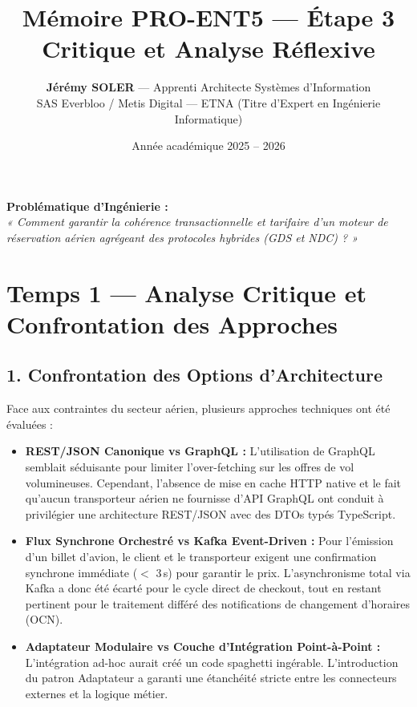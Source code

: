 \documentclass[11pt,a4paper]{article}
\title{\vspace{-1cm}\Huge\textbf{\textcolor{NavyBlue}{Mémoire PRO-ENT5 — Étape 3}}\\[6pt]
\Large\textbf{\textcolor{CobaltBlue}{Critique et Analyse Réflexive}}}
\author{\textbf{Jérémy SOLER} — Apprenti Architecte Systèmes d'Information\\
SAS Everbloo / Metis Digital — ETNA (Titre d'Expert en Ingénierie Informatique)}
\date{Année académique 2025 -- 2026}
\begin{document}
\maketitle

\vspace{0.2cm}
\begin{tcolorbox}[colback=LightGray, colframe=NavyBlue, arc=4pt, boxrule=1.1pt]
\centering\textbf{Problématique d'Ingénierie :}\\
\textit{« Comment garantir la cohérence transactionnelle et tarifaire d'un moteur de réservation aérien agrégeant des protocoles hybrides (GDS et NDC) ? »}
\end{tcolorbox}

\section*{Temps 1 — Analyse Critique et Confrontation des Approches}

\subsection*{1. Confrontation des Options d'Architecture}
Face aux contraintes du secteur aérien, plusieurs approches techniques ont été évaluées :
\begin{itemize}[itemsep=2pt]
    \item \textbf{REST/JSON Canonique vs GraphQL :} L'utilisation de GraphQL semblait séduisante pour limiter l'over-fetching sur les offres de vol volumineuses. Cependant, l'absence de mise en cache HTTP native et le fait qu'aucun transporteur aérien ne fournisse d'API GraphQL ont conduit à privilégier une architecture REST/JSON avec des DTOs typés TypeScript.
    \item \textbf{Flux Synchrone Orchestré vs Kafka Event-Driven :} Pour l'émission d'un billet d'avion, le client et le transporteur exigent une confirmation synchrone immédiate ($<$ 3\,s) pour garantir le prix. L'asynchronisme total via Kafka a donc été écarté pour le cycle direct de checkout, tout en restant pertinent pour le traitement différé des notifications de changement d'horaires (OCN).
    \item \textbf{Adaptateur Modulaire vs Couche d'Intégration Point-à-Point :} L'intégration ad-hoc aurait créé un code spaghetti ingérable. L'introduction du patron Adaptateur a garanti une étanchéité stricte entre les connecteurs externes et la logique métier.
\end{itemize}
\end{document}
